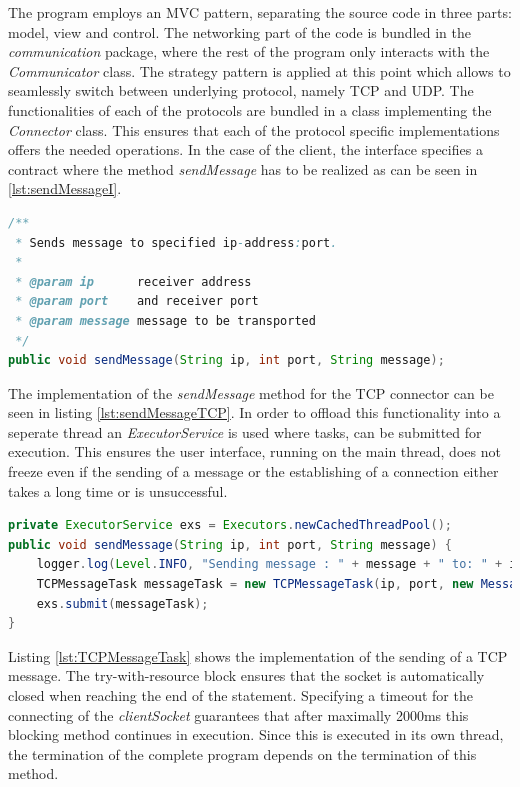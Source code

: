 The program employs an MVC pattern, separating the source code in three parts: model, view and control. The networking part of the code is bundled in the \textit{communication} package, where the rest of the program only interacts with the \textit{Communicator} class. The strategy pattern is applied at this point which allows to seamlessly switch between underlying protocol, namely TCP and UDP. The functionalities of each of the protocols are bundled in a class implementing the \textit{Connector} class. This ensures that each of the protocol specific implementations offers the needed operations. In the case of the client, the interface specifies a contract where the method \textit{sendMessage} has to be realized as can be seen in \ref{lst:sendMessageI}.

\begin{lstlisting}[language=Java, caption={Interface prescribes a sendMessage method},captionpos=b,label=lst:sendMessageI]
/**
 * Sends message to specified ip-address:port.
 *
 * @param ip      receiver address
 * @param port    and receiver port
 * @param message message to be transported
 */
public void sendMessage(String ip, int port, String message);
\end{lstlisting}

The implementation of the \textit{sendMessage} method for the TCP connector can be seen in listing \ref{lst:sendMessageTCP}. In order to offload this functionality into a seperate thread an \textit{ExecutorService} is used where tasks, can be submitted for execution. This ensures the user interface, running on the main thread, does not freeze even if the sending of a message or the establishing of a connection either takes a long time or is unsuccessful.

\begin{lstlisting}[language=Java, caption={TCP sendMessage implementation},captionpos=b,label=lst:sendMessageTCP]
private ExecutorService exs = Executors.newCachedThreadPool();
public void sendMessage(String ip, int port, String message) {
	logger.log(Level.INFO, "Sending message : " + message + " to: " + ip + ":" + port);
	TCPMessageTask messageTask = new TCPMessageTask(ip, port, new Message(message));
	exs.submit(messageTask);
}
\end{lstlisting}

Listing \ref{lst:TCPMessageTask} shows the implementation of the sending of a TCP message. The try-with-resource block ensures that the socket is automatically closed when reaching the end of the statement. Specifying a timeout for the connecting of the \textit{clientSocket} guarantees that after maximally 2000ms this blocking method continues in execution. Since this is executed in its own thread, the termination of the complete program depends on the termination of this method.

